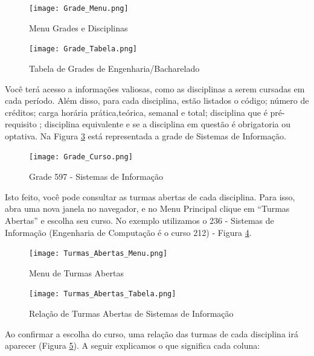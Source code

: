 \documentclass[a4paper,12pt,openany]{article}
\begin{document}
	\begin{figure}[ht!]  \centering
		\texttt{[image: Grade\_Menu.png]}
		\caption{Menu Grades e Disciplinas}
		\label{gradeMenu}
	\end{figure}

	\begin{figure}[ht!]  \centering
		\texttt{[image: Grade\_Tabela.png]}
		\caption{Tabela de Grades de Engenharia/Bacharelado}
		\label{gradeTabela}
	\end{figure}

Você terá acesso a informações valiosas, como as disciplinas a serem cursadas em cada período. Além disso, para cada disciplina, estão listados o código; número de créditos; carga horária prática,teórica, semanal e total; disciplina que é pré-requisito ; disciplina equivalente e se a disciplina em questão é obrigatoria ou optativa. Na Figura \ref{gradeCurso} está representada a grade de Sistemas de Informação.

	\begin{figure}[ht!]  \centering
		\texttt{[image: Grade\_Curso.png]}
		\caption{Grade 597 - Sistemas de Informação}
		\label{gradeCurso}
	\end{figure}

Isto feito, você pode consultar as turmas abertas de cada disciplina. Para isso, abra uma nova janela no navegador, e no Menu Principal clique em ``Turmas Abertas'' e escolha seu curso. No exemplo utilizamos o 236 - Sistemas de Informação (Engenharia de Computação é o curso 212) - Figura \ref{turmasAbertasMenu}.

	\begin{figure}[ht!]  \centering
		\texttt{[image: Turmas\_Abertas\_Menu.png]}
		\caption{Menu de Turmas Abertas}
		\label{turmasAbertasMenu}
	\end{figure}

	\begin{figure}[ht!]  \centering
		\texttt{[image: Turmas\_Abertas\_Tabela.png]}
		\caption{Relação de Turmas Abertas de Sistemas de Informação}
		\label{turmasAbertasTabela}
	\end{figure}

\newpage
Ao confirmar a escolha do curso, uma relação das turmas de cada disciplina irá aparecer (Figura \ref{turmasAbertasTabela}). A seguir explicamos o que significa cada coluna:
\end{document}
